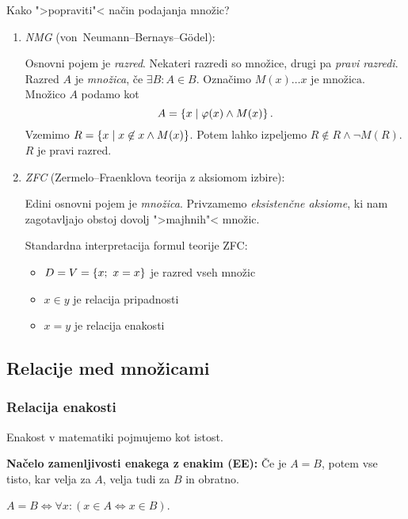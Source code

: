 \documentclass[12pt, a4paper]{article}
\renewcommand{\iff}{\Leftrightarrow}
\begin{document}
Kako ">popraviti"< način podajanja množic?

\begin{enumerate}[label=\Alph*)]
\item \emph{NMG} (von~Neumann--Bernays--Gödel):

Osnovni pojem je \emph{razred}. Nekateri razredi so množice, drugi pa \emph{pravi razredi}. Razred $A$ je \emph{množica}, če $\exists B\colon A\in B$. Označimo $M(x)\dots x\text{ je množica}$. Množico $A$ podamo kot
\[
A=\left\{x\mid\varphi(x)\land M(x)\right\}.
\]
Vzemimo $R=\left\{x\mid x\not\in x\land M(x)\right\}$. Potem lahko izpeljemo $R\not\in R\land\neg M(R)$. $R$ je pravi razred.

\item \emph{ZFC} (Zermelo--Fraenklova teorija z aksiomom izbire):

Edini osnovni pojem je \emph{množica}. Privzamemo \emph{eksistenčne aksiome}, ki nam zagotavljajo obstoj dovolj ">majhnih"< množic.

Standardna interpretacija formul teorije ZFC:

\begin{itemize}
\item $D=V=\left\{x;~x=x\right\}$ je razred vseh množic
\item $x\in y$ je relacija pripadnosti
\item $x=y$ je relacija enakosti
\end{itemize}
\end{enumerate}

\newpage

\subsection{Relacije med množicami}

\subsubsection{Relacija enakosti}

Enakost v matematiki pojmujemo kot istost.

\begin{okvir}
\textbf{Načelo zamenljivosti enakega z enakim (EE):} Če je $A=B$, potem vse tisto, kar velja za $A$, velja tudi za $B$ in obratno.
\end{okvir}

\begin{trditev}
$A=B\iff\forall x\colon(x\in A\iff x\in B)$.
\end{trditev}
\end{document}
